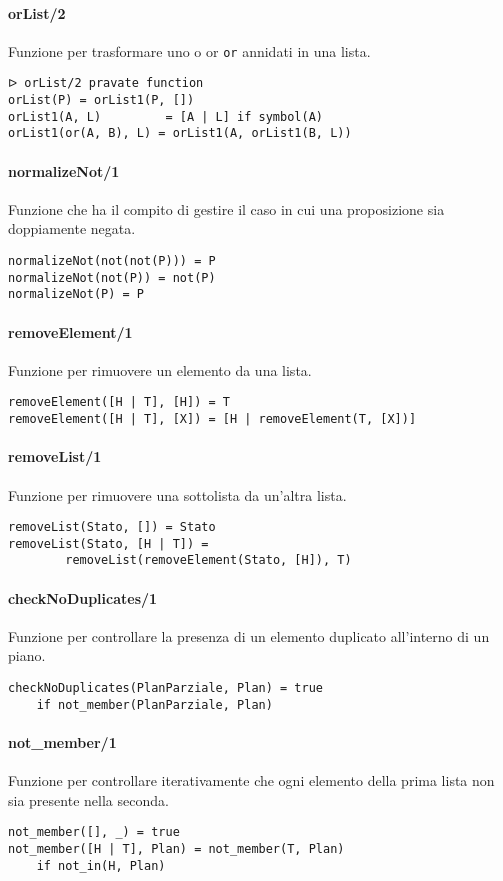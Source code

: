 \documentclass[12pt,twoside]{report}
\begin{document}
\paragraph{orList/2}
Funzione per trasformare uno o or \texttt{or} annidati in una lista.
\begin{lstlisting}
ᐅ orList/2 pravate function
orList(P) = orList1(P, [])
orList1(A, L)         = [A | L] if symbol(A)
orList1(or(A, B), L) = orList1(A, orList1(B, L))
\end{lstlisting}

\paragraph{normalizeNot/1}
Funzione che ha il compito di gestire il caso in cui una proposizione sia doppiamente negata.
\begin{lstlisting}
normalizeNot(not(not(P))) = P
normalizeNot(not(P)) = not(P)
normalizeNot(P) = P
\end{lstlisting}

\paragraph{removeElement/1}
Funzione  per rimuovere un elemento da una lista.
\begin{lstlisting}
removeElement([H | T], [H]) = T
removeElement([H | T], [X]) = [H | removeElement(T, [X])]
\end{lstlisting}

\paragraph{removeList/1}
Funzione per rimuovere una sottolista da un'altra lista.
\begin{lstlisting}
removeList(Stato, []) = Stato
removeList(Stato, [H | T]) = 
        removeList(removeElement(Stato, [H]), T)
\end{lstlisting}

\paragraph{checkNoDuplicates/1}
Funzione per controllare la presenza di un elemento duplicato all'interno di un piano.
\begin{lstlisting}
checkNoDuplicates(PlanParziale, Plan) = true
    if not_member(PlanParziale, Plan)
\end{lstlisting}

\paragraph{not\_member/1}
Funzione per controllare iterativamente che ogni elemento della prima lista non sia presente nella seconda.
\begin{lstlisting}
not_member([], _) = true
not_member([H | T], Plan) = not_member(T, Plan)
    if not_in(H, Plan)
\end{lstlisting}
\end{document}
